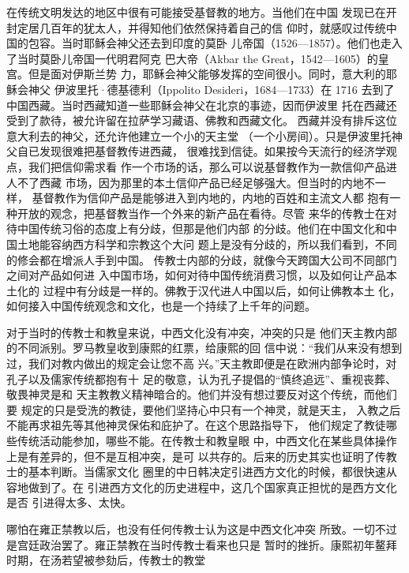 在传统文明发达的地区中很有可能接受基督教的地方。当他们在中国%
发现已在开封定居几百年的犹太人，并得知他们依然保持着自己的信%
仰时，就感叹过传统中国的包容。当时耶稣会神父还去到印度的莫卧%
儿帝国（1526—1857）。他们也走入了当时莫卧儿帝国一代明君阿克%
巴大帝（Akbar the Great，1542—1605）的皇宫。但是面对伊斯兰势%
力，耶稣会神父能够发挥的空间很小。同时，意大利的耶稣会神父%
伊波里托·德基德利（Ippolito Desideri，1684—1733）在 1716 去到了%
中国西藏。当时西藏知道一些耶稣会神父在北京的事迹，因而伊波里%
托在西藏还受到了款待，被允许留在拉萨学习藏语、佛教和西藏文化。%
西藏并没有排斥这位意大利去的神父，还允许他建立一个小的天主堂%
（一个小房间）。只是伊波里托神父自已发现很难把基督教传进西藏，%
很难找到信徒。如果按今天流行的经济学观点，我们把信仰需求看%
作一个市场的话，那么可以说基督教作为一款信仰产品进人不了西藏%
市场，因为那里的本土信仰产品已经足够强大。但当时的内地不一样，%
基督教作为信仰产品是能够进入到内地的，内地的百姓和主流文人都%
抱有一种开放的观念，把基督教当作一个外来的新产品在看待。尽管%
来华的传教士在对待中国传统习俗的态度上有分歧，但那是他们内部%
的分歧。他们在中国文化和中国土地能容纳西方科学和宗教这个大问%
题上是没有分歧的，所以我们看到，不同的修会都在增派人手到中国。%
传教士内部的分歧，就像今天跨国大公司不同部门之间对产品如何进%
入中国市场，如何对待中国传统消费习惯，以及如何让产品本土化的%
过程中有分歧是一样的。佛教于汉代进人中国以后，如何让佛教本土%
化，如何接入中国传统观念和文化，也是一个持续了上千年的问题。%
\par
对于当时的传教士和教皇来说，中西文化没有冲突，冲突的只是%
他们天主教内部的不同派别。罗马教皇收到康熙的红票，给康熙的回%
信中说：“我们从来没有想到过，我们对教内做出的规定会让您不高%
兴。”天主教即便是在欧洲内部争论时，对孔子以及儒家传统都抱有十%
足的敬意，认为孔子提倡的“慎终追远”、重视丧葬、敬畏神灵是和%
天主教教义精神暗合的。他们并没有想过要反对这个传统，而他们要%
规定的只是受洗的教徒，要他们坚持心中只有一个神灵，就是天主，%
入教之后不能再求祖先等其他神灵保佑和庇护了。在这个思路指导下，%
他们规定了教徒哪些传统活动能参加，哪些不能。在传教士和教皇眼%
中，中西文化在某些具体操作上是有差异的，但不是互相冲突，是可%
以共存的。后来的历史其实也证明了传教士的基本判断。当儒家文化%
圈里的中日韩决定引进西方文化的时候，都很快速从容地做到了。在%
引进西方文化的历史进程中，这几个国家真正担忧的是西方文化是否%
引进得太多、太快。%
\par
哪怕在雍正禁教以后，也没有任何传教士认为这是中西文化冲突%
所致。一切不过是宫廷政治罢了。雍正禁教在当时传教士看来也只是%
暂时的挫折。康熙初年鳌拜时期，在汤若望被参劾后，传教士的教堂%
